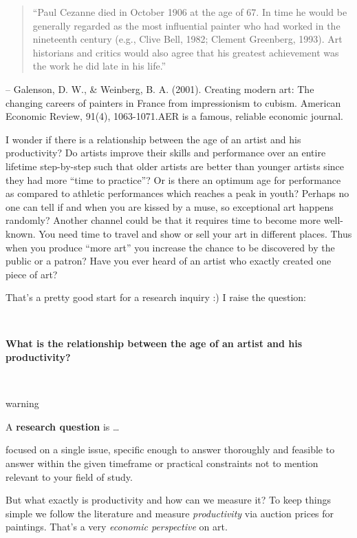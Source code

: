 \documentclass[
]{book}
\begin{document}
\begin{quote}
``Paul Cezanne died in October 1906 at the age of 67. In time he would be generally regarded as the most influential painter who had worked in the nineteenth century (e.g., Clive Bell, 1982; Clement Greenberg, 1993). Art historians and critics would also agree that his greatest achievement was the work he did late in his life.''
\end{quote}

\hfill -- Galenson, D. W., \& Weinberg, B. A. (2001). Creating modern art: The changing careers of painters in France from impressionism to cubism. American Economic Review, 91(4), 1063-1071.AER is a famous, reliable economic journal.

I wonder if there is a relationship between the age of an artist and his productivity? Do artists improve their skills and performance over an entire lifetime step-by-step such that older artists are better than younger artists since they had more ``time to practice''? Or is there an optimum age for performance as compared to athletic performances which reaches a peak in youth? Perhaps no one can tell if and when you are kissed by a muse, so exceptional art happens randomly? Another channel could be that it requires time to become more well-known. You need time to travel and show or sell your art in different places. Thus when you produce ``more art'' you increase the chance to be discovered by the public or a patron? Have you ever heard of an artist who exactly created one piece of art?

That's a pretty good start for a research inquiry :) I raise the question:

~

\textbf{What is the relationship between the age of an artist and his productivity?}

~

\begin{infobox}warning

A \textbf{research question} is \ldots{}

focused on a single issue, specific enough to answer thoroughly and feasible to answer within the given timeframe or practical constraints not to mention relevant to your field of study.

\end{infobox}

But what exactly is productivity and how can we measure it? To keep things simple we follow the literature and measure \emph{productivity} via auction prices for paintings. That's a very \emph{economic perspective} on art.
\end{document}
